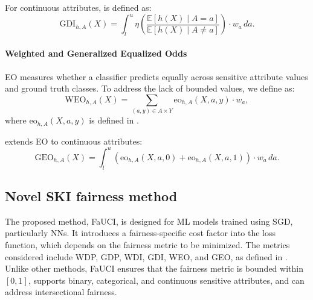For continuous attributes,  is defined as:
%
\begin{equation}
    \label{eq:gdi}
    \text{GDI}_{h,A}(X) = \int_{l}^{u} \eta \left( \frac{\mathbb{E}[h(X) \mid A = a]}{\mathbb{E}[h(X) \mid A \neq a]} \right) \cdot w_a \, da.
\end{equation}


\paragraph{Weighted and Generalized Equalized Odds}
%
\Gls{EO} measures whether a classifier predicts equally across sensitive attribute values and ground truth classes.
%
To address the lack of bounded values, we define  as:
%
\begin{equation}
    \label{eq:weo}
    \text{WEO}_{h,A}(X) = \sum_{(a, y) \in A \times Y} \text{eo}_{h,A}(X, a, y) \cdot w_a,
\end{equation}
%
where \( \text{eo}_{h,A}(X, a, y) \) is defined in .


 extends \gls{EO} to continuous attributes:
%
\begin{equation}
    \label{eq:geo}
    \text{GEO}_{h,A}(X) = \int_{l}^{u} \left( \text{eo}_{h,A}(X, a, 0) + \text{eo}_{h,A}(X, a, 1) \right) \cdot w_a \, da.
\end{equation}



\subsection{Novel SKI fairness method}\label{subsec:novel-fairness-method}
%
The proposed method, \gls{FaUCI}, is designed for \gls{ML} models trained using \gls{SGD}, particularly \glspl{NN}.
%
It introduces a fairness-specific cost factor into the loss function, which depends on the fairness metric to be minimized.
%
The metrics considered include \gls{WDP}, \gls{GDP}, \gls{WDI}, \gls{GDI}, \gls{WEO}, and \gls{GEO}, as defined in .
%
Unlike other methods, \gls{FaUCI} ensures that the fairness metric is bounded within \([0, 1]\), supports binary, categorical, and continuous sensitive attributes, and can address intersectional fairness.

